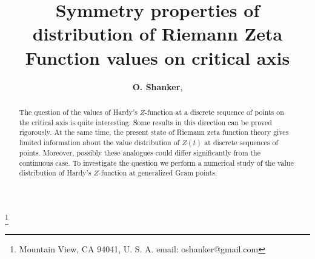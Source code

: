 \documentclass[twoside]{article}
\begin{document}


\newtheorem{theorem}{Theorem}[section]
\newtheorem{lemma}[theorem]{Lemma}

\theoremstyle{definition}
\newtheorem{definition}[theorem]{Definition}
\newtheorem{example}[theorem]{Example}
\newtheorem{xca}[theorem]{Exercise}

\theoremstyle{remark}
\newtheorem{remark}[theorem]{Remark}



\date{}
\lhead[]{}
\rhead[]{}

\title{\bf{Symmetry properties of distribution of Riemann Zeta Function values on critical axis}}

\maketitle


\author{{\textbf{O. Shanker}},}
\thanks{ Mountain View, CA 94041, U. S. A. email: oshanker@gmail.com}

\thispagestyle{fancy}

\begin{abstract}
The question of the values of Hardy's $Z$-function at a discrete sequence of points on the critical axis is quite interesting. Some results in this direction can be proved rigorously. At the same time, the present state of Riemann zeta function theory gives limited information about the value distribution of $Z(t)$ at discrete sequences of points. Moreover, possibly these analogues could differ significantly from the continuous case. To investigate the question we perform a numerical study of the value distribution of Hardy's $Z$-function at generalized Gram points. 

\end{abstract}


\end{document}
